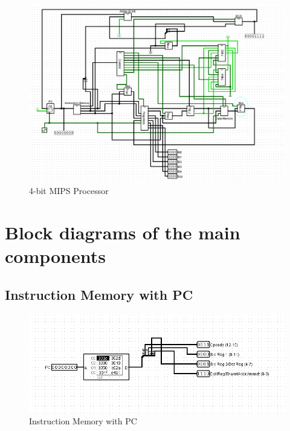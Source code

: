 \documentclass[a4paper]{article}
\begin{document}
\begin{figure}[H]
    \centering
    \includegraphics[height = 15 cm, width=1\linewidth]{completeBlockDiagram.png}
    \caption{4-bit MIPS Processor}
\end{figure}
\newpage
\section{Block diagrams of the main components}
\vspace{0.5cm}
\subsection{Instruction Memory with PC}
\vspace{0.5cm}
\begin{figure}[H]
    \centering
    \includegraphics[width=1\linewidth]{insMemWPC.png}
    \caption{Instruction Memory with PC}
\end{figure}
\end{document}
